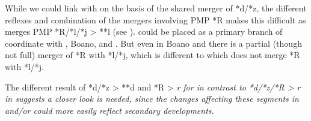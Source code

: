 
While we could link  with  on the basis
of the shared merger of *d/*z,
the different reflexes and combination of the mergers involving
PMP *R makes this difficult as  merges
PMP *R/*l/*j > **l (see ).
 could be placed as a primary branch of 
coordinate with , Boano, and .
But even in Boano
and  there is a partial (though not full) merger of *R with
*l/*j, which is different to  which does not merge *R with *l/*j.

The different result of *d/*z > **d
and *R > \it{r} for  in contrast
to *d/*z/*R > \it{r} in  suggests a closer look is needed,
since the changes affecting these segments in 
and/or  could more easily reflect secondary developments.

